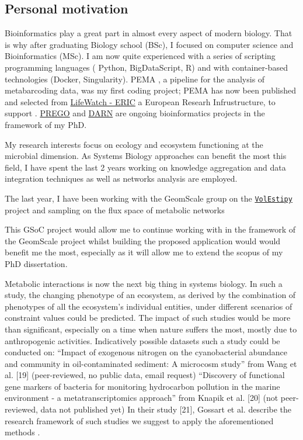\documentclass{article}
\begin{document}
\subsection{Personal motivation}

Bioinformatics play a great part in almost every aspect of modern biology.
That is why after graduating Biology school (BSc), I focused on computer science and Bioinformatics (MSc). 
I am now quite experienced with a series of scripting programming languages ( Python, BigDataScript, R) and with container-based technologies (Docker, Singularity).  
PEMA \cite{zafeiropoulos2020pema}, a pipeline for the analysis of metabarcoding data, was my first coding project; PEMA has now been published and selected from \href{https://www.lifewatch.eu/}{LifeWatch - ERIC} a European Researh Infrustructure, to support .
\href{http://prego.hcmr.gr/}{PREGO} and \href{https://github.com/hariszaf/darn/}{DARN} are ongoing bioinformatics projects in the framework of my PhD.

My research interests focus on ecology and ecosystem functioning at the microbial dimension.
As Systems Biology approaches can benefit the most this field, 
I have spent the last 2 years working on 
knowledge aggregation and data integration techniques as well as networks analysis are employed. 

The last year, I have been working with the GeomScale group on the \href{https://github.com/GeomScale/volume_approximation}{\texttt{\texttt{VolEsti}py}} project
and sampling on the flux space of metabolic networks 

This GSoC project would allow me to continue working with in the framework of the GeomScale project whilst building the proposed application would would benefit me the most, especially as it will allow me to extend the scopus of my PhD dissertation.

Metabolic interactions \cite{cai2020predicting} is now the next big thing in systems biology. 
In such a study, the changing phenotype of an ecosystem, as derived by the combination of phenotypes of all the ecosystem's individual entities, under different scenarios of constraint values could be predicted. 
The impact of such studies would be more than significant, especially on a time when nature suffers the most, mostly due to anthropogenic activities. 
Indicatively possible datasets such a study could be conducted on: 
“Impact of exogenous nitrogen on the cyanobacterial abundance and community in oil-contaminated sediment: A microcosm study” from Wang et al. [19] 
(peer-reviewed, no public data, email request)
“Discovery of functional gene markers of bacteria for monitoring hydrocarbon pollution in the marine environment - a metatranscriptomics approach” from Knapik et al. [20]
(not peer-reviewed, data not published yet)
In their study [21], Gossart et al.  describe the research framework of such studies we suggest to apply the aforementioned methods .
\end{document}

